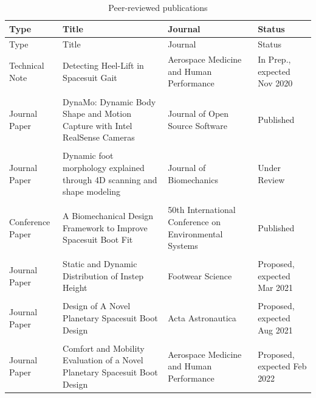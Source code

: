 \documentclass[defaultstyle,11pt]{thesis}
\begin{document}
\pagebreak

\hypertarget{tbl:pubs}{}
\begin{longtable}[]{@{}
  >{\raggedright\arraybackslash}p{}
  >{\raggedright\arraybackslash}p{}
  >{\raggedright\arraybackslash}p{}
  >{\raggedright\arraybackslash}p{}@{}}
\caption{\label{tbl:pubs}Peer-reviewed publications}\tabularnewline
\toprule
Type & Title & Journal & Status \\
\midrule
\endfirsthead
\toprule
Type & Title & Journal & Status \\
\midrule
\endhead
Technical Note & Detecting Heel-Lift in Spacesuit Gait & Aerospace Medicine and Human Performance & In Prep., expected Nov 2020 \\
& & & \\
Journal Paper & DynaMo: Dynamic Body Shape and Motion Capture with Intel RealSense Cameras & Journal of Open Source Software & Published \\
& & & \\
Journal Paper & Dynamic foot morphology explained through 4D scanning and shape modeling & Journal of Biomechanics & Under Review \\
& & & \\
Conference Paper & A Biomechanical Design Framework to Improve Spacesuit Boot Fit & 50th International Conference on Environmental Systems & Published \\
& & & \\
Journal Paper & Static and Dynamic Distribution of Instep Height & Footwear Science & Proposed, expected Mar 2021 \\
& & & \\
Journal Paper & Design of A Novel Planetary Spacesuit Boot Design & Acta Astronautica & Proposed, expected Aug 2021 \\
& & & \\
Journal Paper & Comfort and Mobility Evaluation of a Novel Planetary Spacesuit Boot Design & Aerospace Medicine and Human Performance & Proposed, expected Feb 2022 \\
\bottomrule
\end{longtable}

\pagebreak
\end{document}
